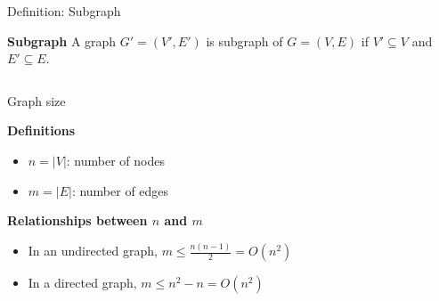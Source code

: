 \documentclass[compress]{beamer}
\begin{document}
\begin{frame}{Definition: Subgraph}
  \begin{block}{\textbf{Subgraph}}
    A graph $G' = (V', E')$ is subgraph of $G = (V, E)$ if $V' \subseteq V$ and $E' \subseteq E$.
  \end{block}
  \begin{columns}
  \begin{center}
  \scalebox{0.7}{}
  \end{center}
  \begin{center}
  \scalebox{0.7}{}
  \end{center}
  \end{columns}
\end{frame}

\begin{frame}{Graph size}
  \begin{block}{\textbf{Definitions}}
    \begin{itemize}
      \item $n = |V|$: number of nodes
      \item $m = |E|$: number of edges
    \end{itemize}
  \end{block}
  \begin{block}{\textbf{Relationships between $n$ and $m$}}
    \begin{itemize}
      \item In an undirected graph, $m \leq \frac{n(n-1)}{2} = O(n^2)$
      \item In a directed graph, $m \leq n^2 - n = O(n^2)$
    \end{itemize}
  \end{block}
\end{frame}
\end{document}

